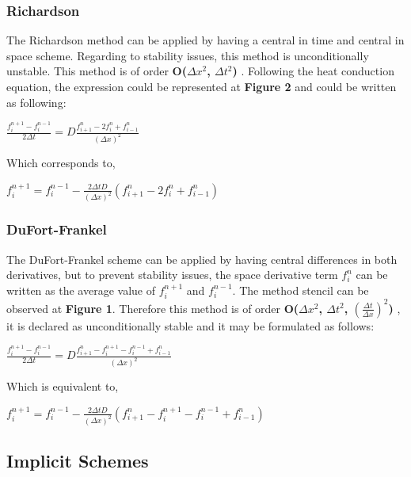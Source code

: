 \documentclass[12pt]{article}
\begin{document}
\subsubsection*{Richardson}
The Richardson method can be applied by having a central in time and central in space scheme. Regarding to stability issues, this method is unconditionally unstable. This method is of order \textbf{O($\Delta x ^2$, $\Delta t ^2$)} \cite{hoffman}. Following the heat conduction equation, the expression could be represented at \textbf{Figure 2} and could be written as following:
\begin{center}
\Large
$
\frac{f_i^{n + 1} - f_i^{n - 1}}{2 \Delta t} = D \frac{f_{i + 1}^{n} - 2f_{i}^{n} + f_{i - 1}^{n}}{(\Delta x)^2}
$
\end{center}
\par Which corresponds to,
\begin{center}
\Large
$
f_{i}^{n + 1} = f_{i}^{n - 1} - \frac{2\Delta t D}{(\Delta x)^2} (f_{i + 1}^{n} - 2 f_{i}^{n} + f_{i - 1}^{n})
$
\end{center}

\subsubsection*{DuFort-Frankel}
\par The DuFort-Frankel scheme can be applied by having central differences in both derivatives, but to prevent stability issues, the space derivative term $f_i^n$ can be written as the average value of $f_{i}^{n + 1}$ and $f_{i}^{n - 1}$. The method stencil can be observed at \textbf{Figure 1}. Therefore this method is of order \textbf{O($\Delta x ^2$, $\Delta t ^2$, $(\frac{\Delta t}{\Delta x}) ^2$)} \cite{hoffman}, it is declared as unconditionally stable and it may be formulated as follows:
\begin{center}
\Large
$
\frac{f_i^{n + 1} - f_i^{n - 1}}{2 \Delta t} = D \frac{f_{i + 1}^{n} - f_{i}^{n + 1} - f_{i}^{n - 1} + f_{i - 1}^{n}}{(\Delta x)^2}
$
\end{center}
\par Which is equivalent to,
\begin{center}
\Large
$
f_{i}^{n + 1} = f_{i}^{n - 1} - \frac{2\Delta t D}{(\Delta x)^2} (f_{i + 1}^{n} - f_{i}^{n + 1} - f_{i}^{n - 1} + f_{i - 1}^{n})
$
\end{center}

\subsection*{Implicit Schemes}
\end{document}
